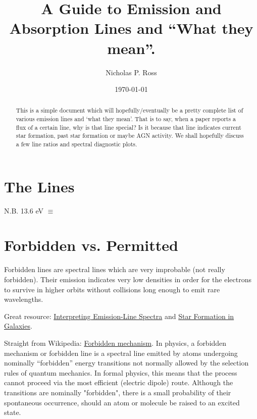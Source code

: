 \documentclass[11pt]{article}
\begin{document}
\title{A Guide to Emission and Absorption Lines and ``What they mean''.}
\author{Nicholas P. Ross}
\date{\today}
\maketitle


\begin{abstract}
This is a simple document which will hopefully/eventually be a pretty complete
list of various emission lines and `what they mean'. That is to say, when a 
paper reports a flux of a certain line, why is that line special? Is it because
that line indicates current star formation, past star formation or maybe
AGN activity. We shall hopefully discuss a few line ratios and spectral
diagnostic plots. 
\end{abstract}


\section{The Lines}
\citet{Croom04}
\noindent
N.B. 13.6 eV $\equiv$


\section{Forbidden vs. Permitted}

Forbidden lines are spectral lines which are very improbable (not really forbidden). Their emission indicates very low densities in order for the electrons to survive in higher orbits without collisions long enough to emit rare wavelengths.

Great resource: \href{http://www.astr.ua.edu/keel/galaxies/emission.html}{Interpreting Emission-Line Spectra} and \href{http://www.astr.ua.edu/keel/galaxies/sfr.html}{Star Formation in Galaxies}. 

Straight from Wikipedia: \href{http://en.wikipedia.org/wiki/Forbidden_mechanism}{Forbidden mechanism}.
In physics, a forbidden mechanism or forbidden line is a spectral line
emitted by atoms undergoing nominally ``forbidden'' energy transitions
not normally allowed by the selection rules of quantum mechanics. In
formal physics, this means that the process cannot proceed via the
most efficient (electric dipole) route. Although the transitions are
nominally "forbidden", there is a small probability of their
spontaneous occurrence, should an atom or molecule be raised to an
excited state. %
\end{document}
